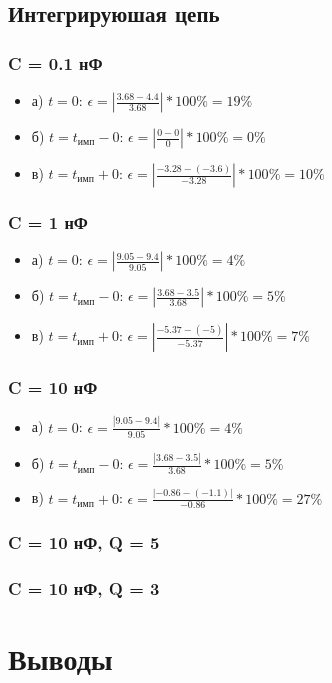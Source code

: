 \subsection{Интегрируюшая цепь}
\subsubsection{C = 0.1 нФ}
\begin{itemize}
\item[] а) $t = 0$: $\epsilon = |\frac{3.68 - 4.4}{ 3.68 }| * 100\% = 19 \%$

\item[] б) $t = t_\text{имп} - 0$: $\epsilon = |\frac{0 - 0}{ 0 }| * 100\% = 0 \%$

\item[] в) $t = t_\text{имп} + 0$: $\epsilon = |\frac{-3.28 - (-3.6)}{ -3.28 }| * 100\% = 10 \%$ 
\end{itemize}

\subsubsection{C = 1 нФ}
\begin{itemize}
\item[] а) $t = 0$: $\epsilon = |\frac{9.05 - 9.4}{ 9.05 }| * 100\% = 4 \%$

\item[] б) $t = t_\text{имп} - 0$: $\epsilon = |\frac{3.68 - 3.5}{ 3.68 }| * 100\% = 5 \%$

\item[] в) $t = t_\text{имп} + 0$: $\epsilon = |\frac{-5.37 - (-5)}{ -5.37 }| * 100\% = 7 \%$
\end{itemize}

\subsubsection{C = 10 нФ}
\begin{itemize}
\item[] а) $t = 0$: $\epsilon = \frac{| 9.05 - 9.4 |}{ 9.05 } * 100\% = 4 \%$

\item[] б) $t = t_\text{имп} - 0$: $\epsilon = \frac{| 3.68 - 3.5 |}{ 3.68 } * 100\% = 5 \%$

\item[] в) $t = t_\text{имп} + 0$: $\epsilon = \frac{| -0.86 - (-1.1) |}{ -0.86 } * 100\% = 27 \%$
\end{itemize}

\subsubsection{C = 10 нФ, Q = 5}

\subsubsection{C = 10 нФ, Q = 3}
  
\section{Выводы}



